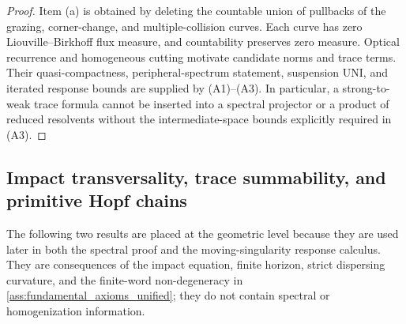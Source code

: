 \documentclass[12pt, letterpaper]{amsart}
\theoremstyle{plain}
\theoremstyle{definition}
\theoremstyle{remark}
\begin{document}
\begin{proof}
Item (a) is obtained by deleting the countable union of pullbacks of the grazing,
corner-change, and multiple-collision curves.  Each curve has zero
Liouville--Birkhoff flux measure, and countability preserves zero measure.
Optical recurrence and homogeneous cutting motivate candidate norms and trace
terms.  Their quasi-compactness, peripheral-spectrum statement, suspension UNI,
and iterated response bounds are supplied by \textup{(A1)--(A3)}.  In
particular, a strong-to-weak trace formula cannot be inserted into a spectral
projector or a product of reduced resolvents without the intermediate-space
bounds explicitly required in \textup{(A3)}.
\end{proof}


\subsection{Impact transversality, trace summability, and primitive Hopf chains}
\label{subsec:impact_trace_hopf_closure}

The following two results are placed at the geometric level because they are
used later in both the spectral proof and the moving-singularity response
calculus.  They are consequences of the impact equation, finite horizon,
strict dispersing curvature, and the finite-word non-degeneracy in
\cref{ass:fundamental_axioms_unified}; they do not contain spectral or
homogenization information.
\end{document}
